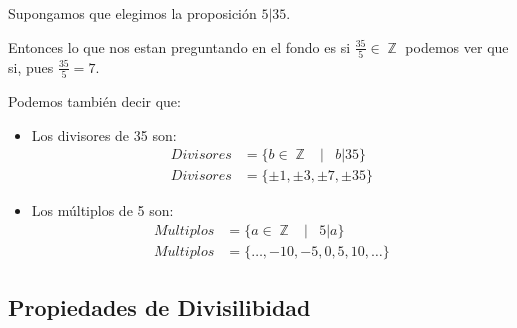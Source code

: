 \documentclass[12pt, fleqn]{report}                             %
\DeclareMathOperator \Space {\quad}                             %
\DeclareMathOperator \MiniSpace {\;}                            %
\newcommand \Such {\MiniSpace|\MiniSpace}                       %
\DeclareMathOperator \Integers  {\mathbb{Z}}                     %
\begin{document}
            Supongamos que elegimos la proposición $5|35$.

            Entonces lo que nos estan preguntando en el fondo es si $\frac{35}{5} \in \Integers$
            podemos ver que si, pues $\frac{35}{5} = 7$.

            Podemos también decir que:

            \begin{itemize}

                \item Los divisores de 35 son:
                    \begin{equation*}
                    \begin{split}
                        Divisores &= \{ b \in \Integers \Such b|35 \}   \\
                        Divisores &= \{ \pm 1, \pm 3, \pm 7, \pm 35 \}
                    \end{split}
                    \end{equation*}


                \item Los múltiplos de 5 son:
                    \begin{equation*}
                    \begin{split}
                        Multiplos &= \{ a \in \Integers \Such 5|a   \}  \\
                        Multiplos &= \{ \dots,-10,-5,0,5,10, \dots  \}
                    \end{split}
                    \end{equation*}

            \end{itemize}







        \clearpage
        \subsection{Propiedades de Divisilibidad}
\end{document}
